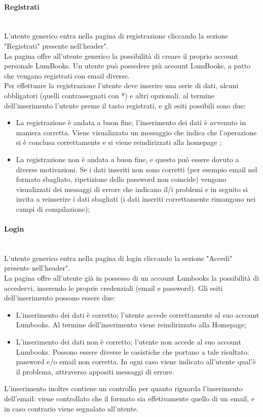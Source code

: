 \paragraph{Registrati}\mbox{}\\
\label{par:Reg}
L'utente generico entra nella pagina di registrazione cliccando la sezione "Registrati" presente nell'header".\\
La pagina offre all'utente generico la possibilità di creare il proprio account personale LumBooks. Un utente può possedere più account LumBooks, a patto che vengano registrati con email diverse.\\
Per effettuare la registrazione l'utente deve inserire una serie di dati, alcuni obbligatori (quelli contrassegnati con *) e altri opzionali. al termine dell'inserimento l'utente preme il tasto registrati, e gli esiti possibili sono due:
\begin{itemize}
	\item La registrazione è andata a buon fine, l'inserimento dei dati è avvenuto in maniera corretta. Viene visualizzato un messaggio che indica che l'operazione si è conclusa correttamente e si viene reindirizzati alla homepage ;
	\item La registrazione non è andata a buon fine, e questo può essere dovuto a diverse motivazioni. Se i dati inseriti non sono corretti (per esempio email nel formato sbagliato, ripetizione della password non coincide) vengono visualizzati dei messaggi di errore che indicano il/i problemi e in seguito si invita a reinserire i dati sbagliati (i dati inseriti correttamente rimangono nei campi di compilazione);
\end{itemize}

\paragraph{Login}\mbox{}\\
\label{par:Login}
L'utente generico entra nella pagina di login cliccando la sezione "Accedi" presente nell'header".\\
La pagina offre all'utente già in possesso di un account Lumbooks la possibilità di accedervi, inserendo le proprie credenziali (email e password). Gli esiti dell'inserimento possono essere due:
\begin{itemize}
	\item L'inserimento dei dati è corretto; l'utente accede correttamente al suo account Lumbooks. Al termine dell'inserimento viene reindirizzato alla Homepage;
	\item L'inserimento dei dati non è corretto; l'utente non accede al suo account Lumbooks. Possono essere diverse le casistiche che portano a tale risultato: password e/o email non corretta. In ogni caso viene indicato all'utente qual'è il problema, attraverso appositi messaggi di errore. 
\end{itemize}
L'inserimento inoltre contiene un controllo per quanto riguarda l'inserimento dell'email: viene controllato che il formato sia effetivamente quello di un email, e in caso contrario viene segnalato all'utente.



